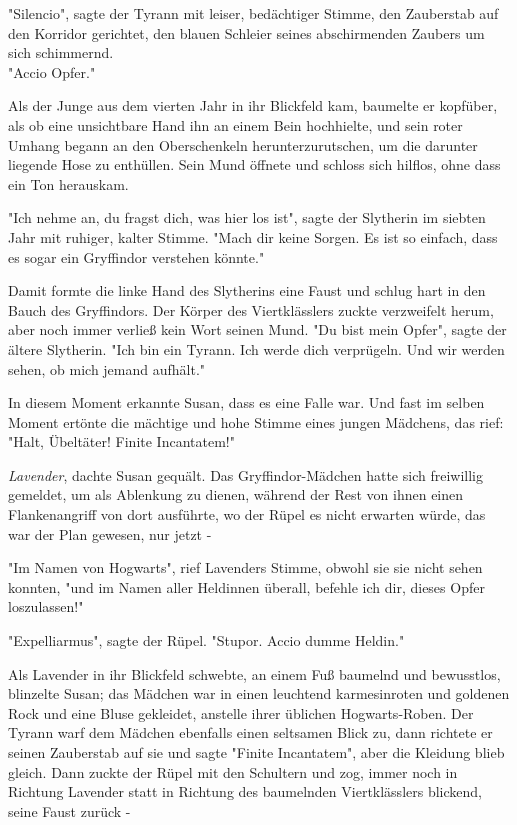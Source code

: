 {"Silencio", sagte der Tyrann mit leiser, bedächtiger Stimme, den Zauberstab auf den Korridor gerichtet, den blauen Schleier seines abschirmenden Zaubers um sich schimmernd.\\ "Accio Opfer."

Als der Junge aus dem vierten Jahr in ihr Blickfeld kam, baumelte er kopfüber, als ob eine unsichtbare Hand ihn an einem Bein hochhielte, und sein roter Umhang begann an den Oberschenkeln herunterzurutschen, um die darunter liegende Hose zu enthüllen. Sein Mund öffnete und schloss sich hilflos, ohne dass ein Ton herauskam.

"Ich nehme an, du fragst dich, was hier los ist", sagte der Slytherin im siebten Jahr mit ruhiger, kalter Stimme. "Mach dir keine Sorgen. Es ist so einfach, dass es sogar ein Gryffindor verstehen könnte."

Damit formte die linke Hand des Slytherins eine Faust und schlug hart in den Bauch des Gryffindors. Der Körper des Viertklässlers zuckte verzweifelt herum, aber noch immer verließ kein Wort seinen Mund. "Du bist mein Opfer", sagte der ältere Slytherin. "Ich bin ein Tyrann. Ich werde dich verprügeln. Und wir werden sehen, ob mich jemand aufhält."

In diesem Moment erkannte Susan, dass es eine Falle war. Und fast im selben Moment ertönte die mächtige und hohe Stimme eines jungen Mädchens, das rief: "Halt, Übeltäter! Finite Incantatem!"

\emph{Lavender}, dachte Susan gequält. Das Gryffindor-Mädchen hatte sich freiwillig gemeldet, um als Ablenkung zu dienen, während der Rest von ihnen einen Flankenangriff von dort ausführte, wo der Rüpel es nicht erwarten würde, das war der Plan gewesen, nur jetzt -

"Im Namen von Hogwarts", rief Lavenders Stimme, obwohl sie sie nicht sehen konnten, "und im Namen aller Heldinnen überall, befehle ich dir, dieses Opfer loszulassen!"

"Expelliarmus", sagte der Rüpel. "Stupor. Accio dumme Heldin."

Als Lavender in ihr Blickfeld schwebte, an einem Fuß baumelnd und bewusstlos, blinzelte Susan; das Mädchen war in einen leuchtend karmesinroten und goldenen Rock und eine Bluse gekleidet, anstelle ihrer üblichen Hogwarts-Roben. Der Tyrann warf dem Mädchen ebenfalls einen seltsamen Blick zu, dann richtete er seinen Zauberstab auf sie und sagte "Finite Incantatem", aber die Kleidung blieb gleich. Dann zuckte der Rüpel mit den Schultern und zog, immer noch in Richtung Lavender statt in Richtung des baumelnden Viertklässlers blickend, seine Faust zurück -

}
